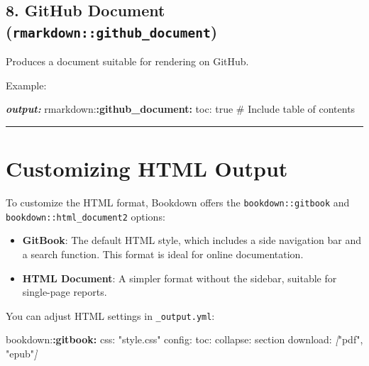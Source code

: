 \documentclass[
]{book}
\newenvironment{Shaded}{\begin{snugshade}}{\end{snugshade}}
\newcommand{\AnnotationTok}[1]{\textcolor[rgb]{0.56,0.35,0.01}{\textbf{\textit{#1}}}}
\newcommand{\CommentTok}[1]{\textcolor[rgb]{0.56,0.35,0.01}{\textit{#1}}}
\newcommand{\NormalTok}[1]{#1}
\newcommand{\OtherTok}[1]{\textcolor[rgb]{0.56,0.35,0.01}{#1}}
\newcommand{\SpecialCharTok}[1]{\textcolor[rgb]{0.81,0.36,0.00}{\textbf{#1}}}
\providecommand{\tightlist}{%
  \setlength{\itemsep}{0pt}\setlength{\parskip}{0pt}}
\theoremstyle{definition}
\theoremstyle{definition}
\theoremstyle{definition}
\theoremstyle{definition}
\theoremstyle{remark}
\begin{document}
\subsection{\texorpdfstring{8. GitHub Document (\texttt{rmarkdown::github\_document})}{8. GitHub Document (rmarkdown::github\_document)}}\label{github-document-rmarkdowngithub_document}

Produces a document suitable for rendering on GitHub.

Example:

\begin{Shaded}
\begin{Highlighting}[]
\AnnotationTok{output:}
\NormalTok{  rmarkdown:}\SpecialCharTok{:github\_document:}
\NormalTok{    toc: true  \# Include table of contents}
\end{Highlighting}
\end{Shaded}

\begin{center}\rule{0.5\linewidth}{0.5pt}\end{center}

\section{Customizing HTML Output}\label{customizing-html-output}

To customize the HTML format, Bookdown offers the \texttt{bookdown::gitbook} and \texttt{bookdown::html\_document2} options:

\begin{itemize}
\tightlist
\item
  \textbf{GitBook}: The default HTML style, which includes a side navigation bar and a search function. This format is ideal for online documentation.
\item
  \textbf{HTML Document}: A simpler format without the sidebar, suitable for single-page reports.
\end{itemize}

You can adjust HTML settings in \texttt{\_output.yml}:

\begin{Shaded}
\begin{Highlighting}[]
\NormalTok{bookdown:}\SpecialCharTok{:gitbook:}
\NormalTok{  css: "style.css"}
\NormalTok{  config:}
\NormalTok{    toc:}
\NormalTok{      collapse: section}
\NormalTok{    download: }\CommentTok{[}\OtherTok{"pdf", "epub"}\CommentTok{]}
\end{Highlighting}
\end{Shaded}
\end{document}
